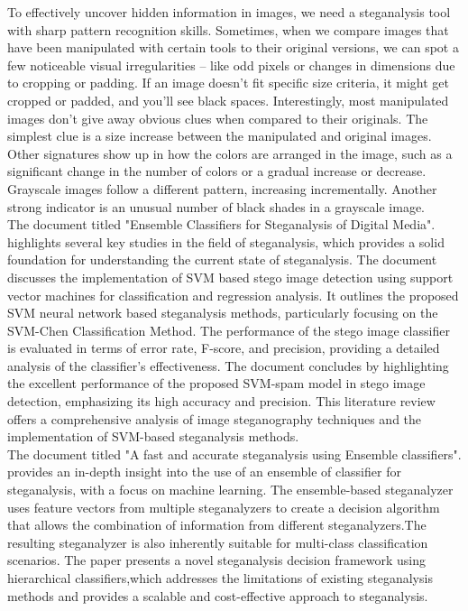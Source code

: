 To effectively uncover hidden information in images, we need a steganalysis tool with sharp pattern recognition skills. Sometimes, when we compare images that have been manipulated with certain tools to their original versions, we can spot a few noticeable visual irregularities – like odd pixels or changes in dimensions due to cropping or padding. If an image doesn't fit specific size criteria, it might get cropped or padded, and you'll see black spaces. Interestingly, most manipulated images don't give away obvious clues when compared to their originals. The simplest clue is a size increase between the manipulated and original images. Other signatures show up in how the colors are arranged in the image, such as a significant change in the number of colors or a gradual increase or decrease. Grayscale images follow a different pattern, increasing incrementally. Another strong indicator is an unusual number of black shades in a grayscale image.\\
The document titled "Ensemble Classifiers for Steganalysis of Digital Media".\cite{5} highlights several key studies in the field of steganalysis, which provides a solid foundation for understanding the current state of steganalysis. The document discusses the implementation of SVM based stego image detection using support vector machines for classification and regression analysis. It outlines the proposed SVM neural network based steganalysis methods, particularly focusing on the SVM-Chen Classification Method. The performance of the stego image classifier is evaluated in terms of error rate, F-score, and precision, providing a detailed analysis of the classifier's effectiveness. The document concludes by highlighting the excellent performance of the proposed SVM-spam model in stego image detection, emphasizing its high accuracy and precision. This literature review offers a comprehensive analysis of image steganography techniques and the implementation of SVM-based steganalysis methods. \\                    
The document titled "A fast and accurate steganalysis using Ensemble classifiers".\cite{6} provides an in-depth insight into the use of an ensemble of classifier for steganalysis, with a focus on machine learning. The ensemble-based steganalyzer uses feature vectors from multiple steganalyzers to create a decision algorithm that allows the combination of information from different steganalyzers.The resulting steganalyzer is also inherently suitable for multi-class classification scenarios. The paper presents a novel steganalysis decision framework using hierarchical classifiers,which addresses the limitations of existing steganalysis methods and provides a scalable and cost-effective approach to steganalysis.
